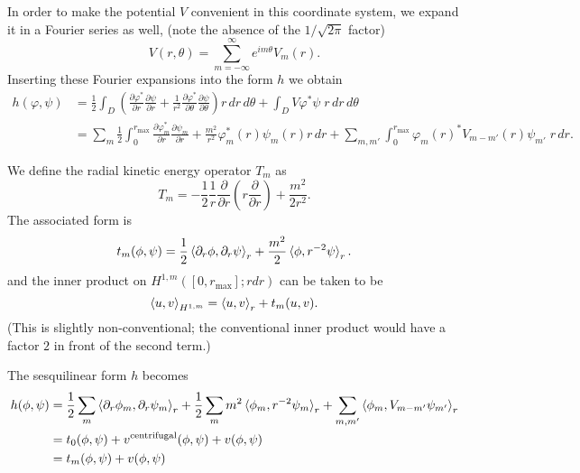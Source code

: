 \documentclass[12pt]{article}
\newcommand{\pdiff}[2]{\frac{\partial #1}{\partial #2}}
\begin{document}
In order to make the potential $V$ convenient in this coordinate system, we expand it in a Fourier series as well,
(note the absence of the $1/\sqrt{2\pi}$ factor)
\begin{equation}
    V(r,\theta) = \sum_{m=-\infty}^\infty e^{im\theta} V_m(r).
\end{equation}
Inserting these Fourier expansions into the form $h$ we obtain
\begin{equation}
    \begin{split}
    h(\varphi,\psi) &= \frac{1}{2} \int_D \left( \pdiff{\varphi^*}{r} \pdiff{\psi}{r} + \frac{1}{r^2} \pdiff{\varphi^*}{\theta} \pdiff{\psi}{\theta} \right) r \, dr\, d\theta + \int_D V \varphi^* \psi \; r \, dr \, d\theta \\
    &= \sum_m \frac{1}{2}  \int_0^{r_\text{max}} \pdiff{\varphi_m^*}{r} \pdiff{\psi_m}{r} + \frac{m^2}{r^2} \varphi_m^*(r) \psi_m(r)  r \, dr + \sum_{m,m'} \int_0^{r_\text{max}} \varphi_m(r)^* V_{m-m'}(r) \psi_{m'} \; r \, dr.
    \end{split}
\end{equation}


We define the radial kinetic energy operator $T_m$ as
\begin{equation}
 T_m = -\frac{1}{2} \frac{1}{r} \frac{\partial}{\partial r} \left( r \frac{\partial}{\partial r} \right) + \frac{m^2}{2r^2} .
\end{equation}
The associated form is
\begin{equation}
    t_m(\phi,\psi) = \frac{1}{2} \braket{\partial_r \phi, \partial_r \psi}_r + \frac{m^2}{2} \braket{\phi,r^{-2}\psi}_r.
\end{equation}
and the inner product on $H^{1,m}([0,r_\text{max}];r dr)$ can be taken to be
\begin{equation}
    \braket{u,v}_{H^{1,m}} = \braket{u,v}_r + t_m(u,v).
\end{equation}
(This is slightly non-conventional; the conventional inner product would have a factor $2$ in front of the second term.)


The sesquilinear form $h$ becomes
\begin{equation}
    \begin{split}
    h(\phi,\psi) &= \frac{1}{2} \sum_m \braket{\partial_r \phi_m, \partial_r \psi_m}_r + \frac{1}{2} \sum_m m^2 \braket{\phi_m,r^{-2}\psi_m}_r + \sum_{m,m'} \braket{\phi_m, V_{m-m'} \psi_{m'}}_r \\
    &= t_0(\phi,\psi) + v^{\text{centrifugal}}(\phi,\psi) + v(\phi,\psi) \\
    &= t_m(\phi,\psi) + v(\phi,\psi) \label{eq:form-polar}
    \end{split}
\end{equation}
\end{document}
